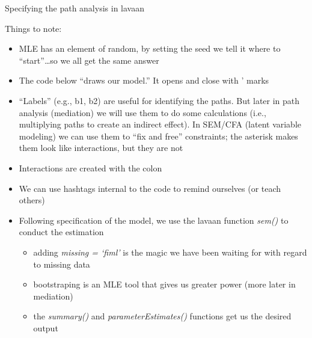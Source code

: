 \documentclass[
  11pt,
]{book}
\providecommand{\tightlist}{%
  \setlength{\itemsep}{0pt}\setlength{\parskip}{0pt}}
\begin{document}
Specifying the path analysis in lavaan

Things to note:

\begin{itemize}
\tightlist
\item
  MLE has an element of random, by setting the seed we tell it where to ``start''\ldots so we all get the same answer
\item
  The code below ``draws our model.'' It opens and close with ' marks
\item
  ``Labels'' (e.g., b1, b2) are useful for identifying the paths. But later in path analysis (mediation) we will use them to do some calculations (i.e., multiplying paths to create an indirect effect). In SEM/CFA (latent variable modeling) we can use them to ``fix and free'' constraints; the asterisk makes them look like interactions, but they are not
\item
  Interactions are created with the colon
\item
  We can use hashtags internal to the code to remind ourselves (or teach others)
\item
  Following specification of the model, we use the lavaan function \emph{sem()} to conduct the estimation

  \begin{itemize}
  \tightlist
  \item
    adding \emph{missing = `fiml'} is the magic we have been waiting for with regard to missing data
  \item
    bootstraping is an MLE tool that gives us greater power (more later in mediation)
  \item
    the \emph{summary()} and \emph{parameterEstimates()} functions get us the desired output
  \end{itemize}
\end{itemize}
\end{document}
